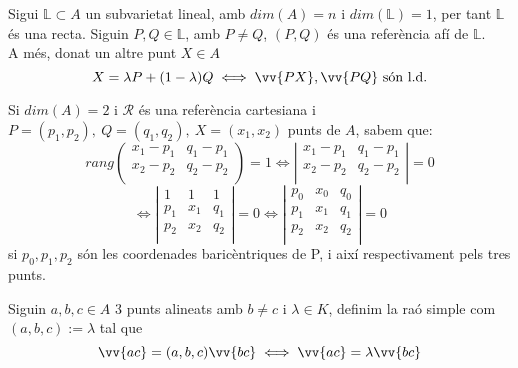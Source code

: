 \begin{prop}
	Sigui $\mathbb{L}\subset A$ un subvarietat lineal, amb $dim(A)=n$ i $dim(\mathbb{L})=1$, per tant $\mathbb{L}$ és una recta. Siguin $P,Q\in\mathbb{L}$, amb $P\neq Q$, $(P,Q)$ és una referència afí de $\mathbb{L}$. \\
	A més, donat un altre punt $X\in A$ 
	$$X=\lambda P+(1-\lambda)Q\iff\vv{PX},\vv{PQ}\text{ són l.d.}$$
\end{prop}
\begin{exmp}
	Si $dim(A)=2$ i $\mathcal{R}$ és una referència cartesiana i $P=(p_1,p_2),\: Q=(q_1,q_2),\: X=(x_1,x_2)$ punts de $A$, sabem que:
	\[rang\left(\begin{array}{cc}
		x_1-p_1 & q_1-p_1 \\
		x_2-p_2 & q_2-p_2 \\
	\end{array}\right)=1\iff\left|\begin{array}{cc}
		x_1-p_1 & q_1-p_1 \\
		x_2-p_2 & q_2-p_2 \\
	\end{array}\right|=0\]
	\[\iff\left|\begin{array}{ccc}
		1   & 1   & 1   \\
		p_1 & x_1 & q_1 \\
		p_2 & x_2 & q_2 \\
	\end{array}\right|=0\iff\left|\begin{array}{ccc}
		p_0 & x_0 & q_0 \\
		p_1 & x_1 & q_1 \\
		p_2 & x_2 & q_2 \\
	\end{array}\right|=0\]
	si $p_0,p_1,p_2$ són les coordenades baricèntriques de P, i així respectivament pels tres punts.
\end{exmp}

\begin{defn}
	Siguin $a,b,c\in A$ 3 punts alineats amb $b\neq c$ i $\lambda\in K$, definim la raó simple com $(a,b,c):=\lambda$ tal que
	$$\vv{ac}=(a,b,c)\vv{bc}\iff\vv{ac}=\lambda\vv{bc}$$
\end{defn}

